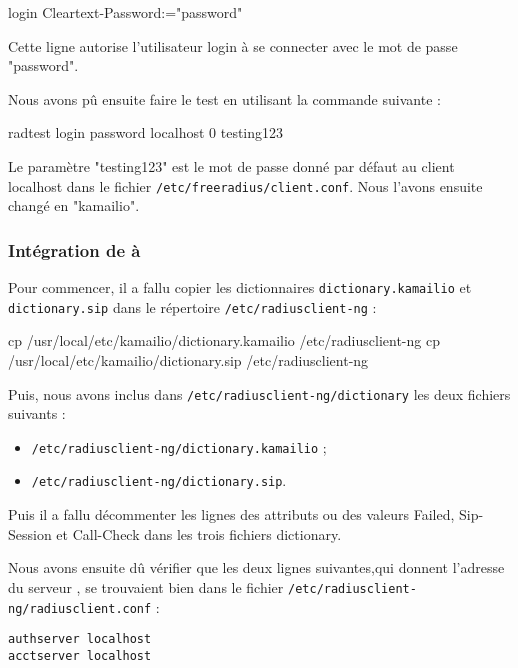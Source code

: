 login Cleartext-Password:="password"

Cette ligne autorise l'utilisateur login à se connecter avec le mot de passe "password".

Nous avons pû ensuite faire le test en utilisant la commande suivante :

\begin{shellcode}
radtest login password localhost 0 testing123
\end{shellcode}

Le paramètre "testing123" est le mot de passe donné par défaut au client localhost dans le fichier \texttt{/etc/freeradius/client.conf}. Nous l'avons ensuite changé en "kamailio".

\subsubsection{Intégration de {\rad} à {\kam}}

Pour commencer, il a fallu copier les dictionnaires \texttt{dictionary.kamailio} et \texttt{dictionary.sip} dans le répertoire \texttt{/etc/radiusclient-ng} :

\begin{shellcode}
cp /usr/local/etc/kamailio/dictionary.kamailio /etc/radiusclient-ng
cp /usr/local/etc/kamailio/dictionary.sip /etc/radiusclient-ng
\end{shellcode}

Puis, nous avons inclus dans \texttt{/etc/radiusclient-ng/dictionary} les deux fichiers suivants :

\begin{itemize}
\item{\texttt{/etc/radiusclient-ng/dictionary.kamailio} ;}
\item{\texttt{/etc/radiusclient-ng/dictionary.sip}.}
\end{itemize}

Puis il a fallu décommenter les lignes des attributs ou des valeurs Failed, Sip-Session et Call-Check dans les trois fichiers dictionary.

Nous avons ensuite dû vérifier que les deux lignes suivantes,qui donnent l'adresse du serveur {\rad}, se trouvaient bien dans le fichier \texttt{/etc/radiusclient-ng/radiusclient.conf} :

\begin{verbatim}
authserver localhost
acctserver localhost
\end{verbatim}

